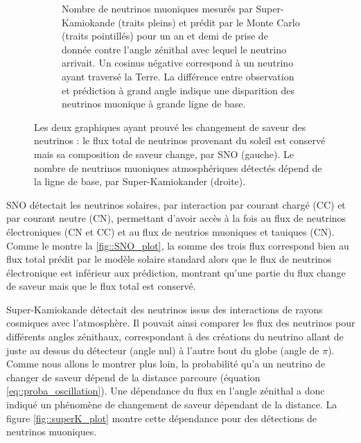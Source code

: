 \begin{figure}[htbp]
\begin{subfigure}[t]{0.4\textwidth}
                    \caption{Nombre de neutrinos muoniques mesurés par Super-Kamiokande (traits pleins) et prédit par le Monte Carlo (traits pointillés) pour un an et demi de prise de donnée contre l'angle zénithal avec lequel le neutrino arrivait\cite{Fukuda1998}. Un cosinus négative correspond à un neutrino ayant traversé la Terre. La différence entre observation et prédiction à grand angle indique une disparition des neutrinos muonique à grande ligne de base.}
                    \label{fig::superK_plot}
                \end{subfigure}
                \caption[Les preuves que les neutrinos changent de saveur, par SNO et Super-Kamiokande.]{Les deux graphiques ayant prouvé les changement de saveur des neutrinos : le flux total de neutrinos provenant du soleil est conservé mais sa composition de saveur change, par SNO (gauche). Le nombre de neutrinos muoniques atmosphériques détectés dépend de la ligne de base, par Super-Kamiokander (droite).}
            \end{figure}
            
            SNO détectait les neutrinos solaires, par interaction par courant chargé (CC) et par courant neutre (CN), permettant d'avoir accès à la fois au flux de neutrinos électroniques (CN et CC) et au flux de neutrios muoniques et tauiques (CN). Comme le montre la \autoref{fig::SNO_plot}, la somme des trois flux correspond bien au flux total prédit par le modèle solaire standard alors que le flux de neutrinos électronique est inférieur aux prédiction, montrant qu'une partie du flux change de saveur mais que le flux total est conservé.
            
            Super-Kamiokande détectait des neutrinos issus des interactions de rayons cosmiques avec l'atmosphère. Il pouvait ainsi comparer les flux des neutrinos pour différents angles zénithaux, correspondant à des créations du neutrino allant de juste au dessus du détecteur (angle nul) à l'autre bout du globe (angle de $\pi$). Comme nous allons le montrer plus loin, la probabilité qu'a un neutrino de changer de saveur dépend de la distance parcoure (équation \eqref{eq::proba_oscillation}). Une dépendance du flux en l'angle zénithal a donc indiqué un phénomène de changement de saveur dépendant de la distance. La figure \autoref{fig::superK_plot} montre cette dépendance pour des détections de neutrinos muoniques.
    
